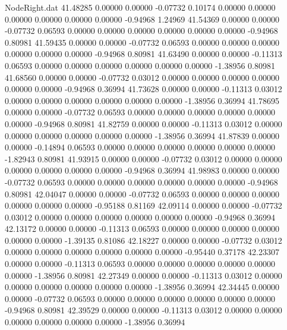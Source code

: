 \begin{filecontents}{NodeRight.dat}
  41.48285    0.00000    0.00000    -0.07732    0.10174    0.00000    0.00000    0.00000    0.00000    0.00000    0.00000   -0.94968    1.24969
  41.54369    0.00000    0.00000    -0.07732    0.06593    0.00000    0.00000    0.00000    0.00000    0.00000    0.00000   -0.94968    0.80981
  41.59435    0.00000    0.00000    -0.07732    0.06593    0.00000    0.00000    0.00000    0.00000    0.00000    0.00000   -0.94968    0.80981
  41.63490    0.00000    0.00000    -0.11313    0.06593    0.00000    0.00000    0.00000    0.00000    0.00000    0.00000   -1.38956    0.80981
  41.68560    0.00000    0.00000    -0.07732    0.03012    0.00000    0.00000    0.00000    0.00000    0.00000    0.00000   -0.94968    0.36994
  41.73628    0.00000    0.00000    -0.11313    0.03012    0.00000    0.00000    0.00000    0.00000    0.00000    0.00000   -1.38956    0.36994
  41.78695    0.00000    0.00000    -0.07732    0.06593    0.00000    0.00000    0.00000    0.00000    0.00000    0.00000   -0.94968    0.80981
  41.82759    0.00000    0.00000    -0.11313    0.03012    0.00000    0.00000    0.00000    0.00000    0.00000    0.00000   -1.38956    0.36994
  41.87839    0.00000    0.00000    -0.14894    0.06593    0.00000    0.00000    0.00000    0.00000    0.00000    0.00000   -1.82943    0.80981
  41.93915    0.00000    0.00000    -0.07732    0.03012    0.00000    0.00000    0.00000    0.00000    0.00000    0.00000   -0.94968    0.36994
  41.98983    0.00000    0.00000    -0.07732    0.06593    0.00000    0.00000    0.00000    0.00000    0.00000    0.00000   -0.94968    0.80981
  42.04047    0.00000    0.00000    -0.07732    0.06593    0.00000    0.00000    0.00000    0.00000    0.00000    0.00000   -0.95188    0.81169
  42.09114    0.00000    0.00000    -0.07732    0.03012    0.00000    0.00000    0.00000    0.00000    0.00000    0.00000   -0.94968    0.36994
  42.13172    0.00000    0.00000    -0.11313    0.06593    0.00000    0.00000    0.00000    0.00000    0.00000    0.00000   -1.39135    0.81086
  42.18227    0.00000    0.00000    -0.07732    0.03012    0.00000    0.00000    0.00000    0.00000    0.00000    0.00000   -0.95440    0.37178
  42.23307    0.00000    0.00000    -0.11313    0.06593    0.00000    0.00000    0.00000    0.00000    0.00000    0.00000   -1.38956    0.80981
  42.27349    0.00000    0.00000    -0.11313    0.03012    0.00000    0.00000    0.00000    0.00000    0.00000    0.00000   -1.38956    0.36994
  42.34445    0.00000    0.00000    -0.07732    0.06593    0.00000    0.00000    0.00000    0.00000    0.00000    0.00000   -0.94968    0.80981
  42.39529    0.00000    0.00000    -0.11313    0.03012    0.00000    0.00000    0.00000    0.00000    0.00000    0.00000   -1.38956    0.36994

\end{filecontents}
